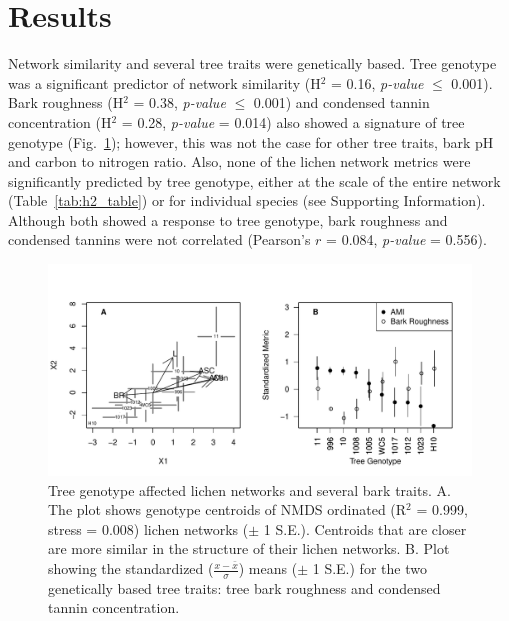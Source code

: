 \documentclass[11pt,twocolumn,twoside,lineno]{pnas-new}
\begin{document}
\showmatmethods{} %

\section*{Results}

Network similarity and several tree traits were genetically
based. Tree genotype was a significant predictor of network similarity
(H$^2$ = 0.16, \textit{p-value} $\leq$ 0.001). Bark roughness (H$^2$ =
0.38, \textit{p-value} $\leq$ 0.001) and condensed tannin
concentration (H$^2$ = 0.28, \textit{p-value} = 0.014) also showed a
signature of tree genotype (Fig.~\ref{fig:h2_plot}); however, this was
not the case for other tree traits, bark pH and carbon to nitrogen
ratio. Also, none of the lichen network metrics were significantly
predicted by tree genotype, either at the scale of the entire network
(Table~\ref{tab:h2_table}) or for individual species (see Supporting
Information). Although both showed a response to tree genotype, bark
roughness and condensed tannins were not correlated (Pearson's $r$ =
0.084, \textit{p-value} = 0.556).



\begin{figure}[ht]
\centering
\includegraphics[width=\linewidth]{h2_plot.pdf}
\caption{Tree genotype affected lichen networks and several bark
  traits. A. The plot shows genotype centroids of NMDS ordinated
  (R$^2$ = 0.999, stress = 0.008) lichen networks ($\pm$ 1
  S.E.). Centroids that are closer are more similar in the structure
  of their lichen networks.  B. Plot showing the standardized
  ($\frac{x - \bar{x}}{\sigma}$) means ($\pm$ 1 S.E.) for the two
  genetically based tree traits: tree bark roughness and condensed
  tannin concentration.}
\label{fig:h2_plot}
\end{figure}
\end{document}
